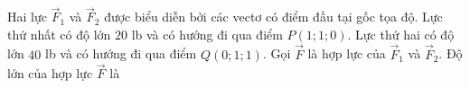 \begin{ex}
Hai lực $\vec F_1$ và $\vec F_2$ được biểu diễn bởi các vectơ có điểm đầu tại gốc tọa độ. Lực thứ nhất có độ lớn $20$ lb và có hướng đi qua điểm $P(1;1;0)$. Lực thứ hai có độ lớn $40$ lb và có hướng đi qua điểm $Q(0;1;1)$. Gọi $\vec F$ là hợp lực của $\vec F_1$ và $\vec F_2$. Độ lớn của hợp lực $\vec F$ là
\end{ex}

